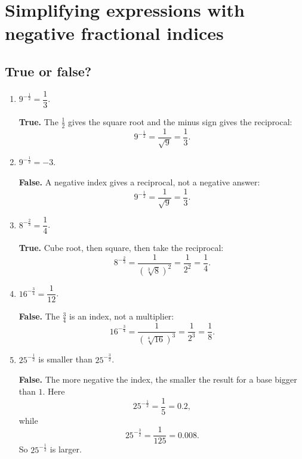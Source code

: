 \documentclass[11pt]{article}
\begin{document}
\section{Simplifying expressions with negative fractional indices}

\subsection*{True or false?}
\begin{enumerate}
\item $9^{-\frac{1}{2}}=\dfrac{1}{3}$.

\textbf{True.} The $\frac{1}{2}$ gives the square root and the minus sign gives the reciprocal:
\[
9^{-\frac{1}{2}}=\frac{1}{\sqrt{9}}=\frac{1}{3}.
\]

\item $9^{-\frac{1}{2}}=-3$.

\textbf{False.} A negative index gives a reciprocal, not a negative answer:
\[
9^{-\frac{1}{2}}=\frac{1}{\sqrt{9}}=\frac{1}{3}.
\]

\item $8^{-\frac{2}{3}}=\dfrac{1}{4}$.

\textbf{True.} Cube root, then square, then take the reciprocal:
\[
8^{-\frac{2}{3}}
=\frac{1}{\left(\sqrt[3]{8}\right)^2}
=\frac{1}{2^2}
=\frac{1}{4}.
\]

\item $16^{-\frac{3}{4}}=\dfrac{1}{12}$.

\textbf{False.} The $\frac{3}{4}$ is an index, not a multiplier:
\[
16^{-\frac{3}{4}}
=\frac{1}{\left(\sqrt[4]{16}\right)^3}
=\frac{1}{2^3}
=\frac{1}{8}.
\]

\item $25^{-\frac{1}{2}}$ is smaller than $25^{-\frac{3}{2}}$.

\textbf{False.} The more negative the index, the smaller the result for a base bigger than $1$. Here
\[
25^{-\frac{1}{2}}=\frac{1}{5}=0.2,
\]
while
\[
25^{-\frac{3}{2}}=\frac{1}{125}=0.008.
\]
So $25^{-\frac{1}{2}}$ is larger.
\end{enumerate}
\end{document}
